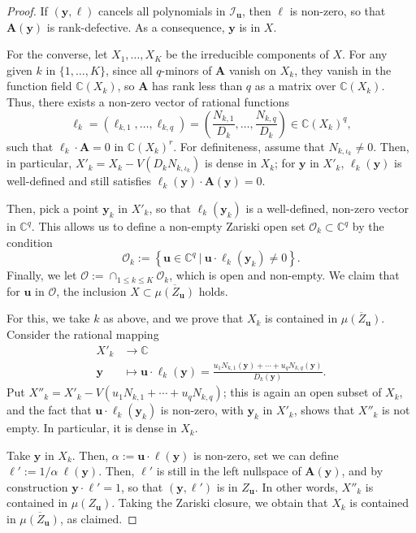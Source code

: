 \documentclass[12pt]{article}
\def\mA{{\bm A}}
\def\ub{{\bm u}}
\def\C{\mathbb{C}}
\begin{document}
\begin{proof}
  If $(\bm y, \bm \ell)$ cancels all polynomials in $\mathscr{I}_{\bm
    u}$, then $\bm \ell$ is non-zero, so that $\bm A(\bm y)$ is
  rank-defective. As a consequence, $\bm y$ is in $X$.

  For the converse, let $X_1,\dots,X_K$ be the irreducible components
  of $X$.  For any given $k$ in $\{1,\dots,K\}$, since all $q$-minors
  of $\mA$ vanish on $X_k$, they vanish in the function field
  $\C(X_k)$, so $\mA$ has rank less than $q$ as a matrix over
  $\C(X_k)$. Thus, there exists a non-zero vector of rational
  functions
  \[\bm \ell_k = (\ell_{k,1},\hdots,\ell_{k,q})=\left(\frac{N_{k,1}}{D_k},\hdots,\frac{N_{k,q}}{D_k}\right)\in \C(X_k)^q,\]
  such that $\bm \ell_k  \cdot \bm A = 0$ in $\C(X_k)^r$. 
  For definiteness, assume that $N_{k,\iota_k} \ne 0.$ Then, in particular,
  $X'_k = X_k - V( D_k N_{k,\iota_k})$ is dense in $X_k$; for 
  $\bm y$ in $X'_k$, $\ell_k(\bm y)$ is well-defined and still
  satisfies $\bm \ell_k(\bm y) \cdot \bm A(\bm y) = 0$.
  
  Then, pick a point $\bm y_k$ in $X'_k$, so that
  $\bm \ell_k(\bm y_k)$ is a well-defined, non-zero vector in
  $\C^q$. This allows us to define a non-empty Zariski open set
  $\mathscr{O}_k \subset \C^q$ by the condition
  \[
  \mathscr{O}_k := 
  \left\{\bm u \in \C^q~|~ \bm u \cdot \bm \ell_k(\bm y_k) \ne 0\right \}.
  \]
  Finally, we let $\mathscr{O} := \cap_{1 \le k \le K}
  \mathscr{O}_{k}$, which is open and non-empty. We claim that for
  $\bm u$ in $\mathscr{O}$, the inclusion $X \subset
  \overline{\mu(Z_{\bm u})}$ holds. 

  For this, we take $k$ as above, 
  and we prove that $X_k$ is contained in $\overline{\mu(Z_{\bm u})}$.
  Consider the rational mapping 
  \begin{align*}
    X'_k  &\rightarrow \C\\    
    \bm y &\mapsto \ub \cdot \bm \ell_k(\bm y) = \frac{ u_1 N_{k,1}(\bm y) + \cdots + u_q N_{k,q}(\bm y)}{D_k(\bm y)}.    
  \end{align*}
  Put $X''_k = X'_k - V(u_1 N_{k,1} + \cdots + u_q N_{k,q})$; this is
  again an open subset of $X_k$, and the fact that $\bm u \cdot \bm
  \ell_k(\bm y_k)$ is non-zero, with $\bm y_k$ in $X'_k$, shows that
  $X''_k$ is not empty. In particular, it is dense in $X_k$.   

  Take $\bm y$ in $X_k$. Then, $\alpha:=\bm u \cdot \bm \ell(\bm y)$
  is non-zero, set we can define $\bm \ell' := 1/\alpha\ \ell(\bm y)$.
  Then, $\bm \ell'$ is still in the left nullspace of $\bm A(\bm y)$,
  and by construction $\bm y \cdot \bm \ell' =1$, so that $(\bm y, \bm
  \ell')$ is in $Z_{\bm u}$. In other words, $X''_k$ is contained in
  $\mu(Z_{\bm u})$. Taking the Zariski closure, we obtain that $X_k$ 
  is contained in $\overline{\mu(Z_{\bm u})}$, as claimed.
\end{proof}
\end{document}
